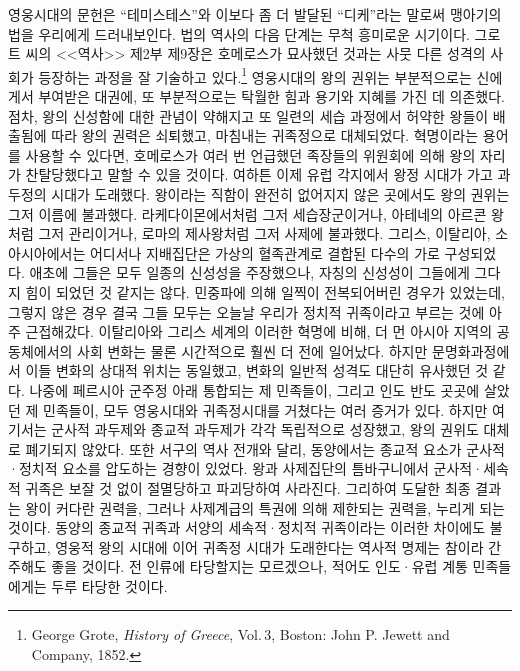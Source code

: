 영웅시대의 문헌은 ``테미스테스''와 이보다 좀 더 발달된 ``디케''라는 말로써
맹아기의 법을 우리에게 드러내보인다.
법의 역사의 다음 단계는 무척 흥미로운 시기이다.
그로트 씨의 <<역사>> 제2부 제9장은 호메로스가 묘사했던 것과는
사뭇 다른 성격의 사회가 등장하는 과정을 잘 기술하고 있다.\footnote{%
  \latinmarks
  George Grote,
  \textit{History of Greece},
  Vol.\,3,
  Boston: John P. Jewett and Company,
  1852. }
영웅시대의 왕의 권위는 부분적으로는 신에게서 부여받은 대권에,
또 부분적으로는 탁월한 힘과 용기와 지혜를 가진 데 의존했다.
점차, 왕의 신성함에 대한 관념이 약해지고 또
일련의 세습 과정에서 허약한 왕들이 배출됨에 따라
왕의 권력은 쇠퇴했고, 마침내는 귀족정으로 대체되었다.
혁명이라는 용어를 사용할 수 있다면,
호메로스가 여러 번 언급했던 족장들의 위원회에 의해
왕의 자리가 찬탈당했다고 말할 수 있을 것이다.
여하튼 이제 유럽 각지에서 왕정 시대가 가고 과두정의 시대가 도래했다.
왕이라는 직함이 완전히 없어지지 않은 곳에서도 왕의 권위는 그저
이름에 불과했다.
라케다이몬에서처럼 그저 세습장군이거나,
아테네의 아르콘 왕처럼 그저 관리이거나,
로마의 제사왕처럼
그저 사제에 불과했다.
그리스, 이탈리아, 소아시아에서는 어디서나
지배집단은 가상의 혈족관계로 결합된 다수의 가로
구성되었다.
애초에 그들은 모두 일종의 신성성을 주장했으나,
자칭의 신성성이 그들에게 그다지 힘이 되었던 것 같지는 않다.
민중파에 의해 일찍이 전복되어버린 경우가 있었는데,
그렇지 않은 경우 결국 그들 모두는
오늘날 우리가 정치적 귀족이라고 부르는 것에 아주 근접해갔다.
이탈리아와 그리스 세계의 이러한 혁명에 비해,
더 먼 아시아 지역의 공동체에서의 사회 변화는
물론 시간적으로 훨씬 더 전에 일어났다.
하지만 문명화과정에서 이들 변화의 상대적 위치는 동일했고,
변화의 일반적 성격도 대단히 유사했던 것 같다.
나중에 페르시아 군주정 아래 통합되는 제 민족들이,
그리고 인도 반도 곳곳에 살았던 제 민족들이,
모두 영웅시대와 귀족정시대를 거쳤다는 여러 증거가 있다.
하지만 여기서는 군사적 과두제와 종교적 과두제가 각각 독립적으로 성장했고,
왕의 권위도 대체로 폐기되지 않았다.
또한 서구의 역사 전개와 달리, 동양에서는
종교적 요소가 군사적^^b7정치적 요소를 압도하는 경향이 있었다.
왕과 사제집단의 틈바구니에서 군사적^^b7세속적 귀족은 보잘 것 없이
절멸당하고 파괴당하여 사라진다.
그리하여 도달한 최종 결과는
왕이 커다란 권력을, 그러나 사제계급의 특권에 의해 제한되는 권력을,
누리게 되는 것이다.
동양의 종교적 귀족과 서양의 세속적^^b7정치적 귀족이라는
이러한 차이에도 불구하고,
영웅적 왕의 시대에 이어 귀족정 시대가 도래한다는 역사적 명제는
참이라 간주해도 좋을 것이다.
전 인류에 타당할지는 모르겠으나, 적어도 인도^^b7유럽 계통 민족들에게는
두루 타당한 것이다.


